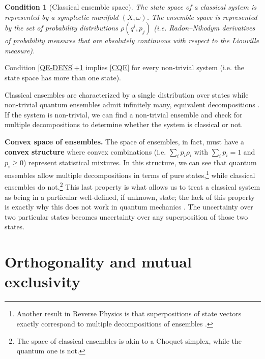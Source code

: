 \documentclass[entropy,article,submit,moreauthors]{Definitions/mdpi}
\newtheorem{condth}{Condition}
\renewcommand*{\thecondth}{\Roman{condth}}
\newenvironment{condition}[2][]{\renewcommand{\thecondth}{#2}\begin{condth}[#1]\label{#2}}{\end{condth}\renewcommand{\thecondth}{\Roman{condth}}}
\begin{document}
\begin{condition}[Classical ensemble space]{CE}
	The state space of a classical system is represented by a symplectic manifold $(X,\omega)$. The ensemble space is represented by the set of probability distributions $\rho(q^i,p_j)$ (i.e. Radon--Nikodym derivatives of probability measures that are absolutely continuous with respect to the Liouville measure).
\end{condition}

\begin{Theorem}
	Condition \ref{QE-DENS}+\ref{CE} implies \ref{CQE} for every non-trivial system (i.e. the state space has more than one state).
\end{Theorem}

Classical ensembles are characterized by a single distribution over states while non-trivial quantum ensembles admit infinitely many, equivalent decompositions \cite{BengtssonZyczkowski2017,Kupsch1998}. If the system is non-trivial, we can find a non-trivial ensemble and check for multiple decompositions to determine whether the system is classical or not.

\textbf{Convex space of ensembles.} The space of ensembles, in fact, must have a \textbf{convex structure} where convex combinations (i.e. $\sum_i p_i \rho_i$ with $\sum_i p_i = 1$ and $p_i\geq 0$) represent statistical mixtures. In this structure, we can see that quantum ensembles allow multiple decompositions in terms of pure states,\footnote{Another result in Reverse Physics is that superpositions of state vectors exactly correspond to multiple decompositions of ensembles \cite{CarcassiCalderonAidala2025,Carcassi2026Superpositions}.} while classical ensembles do not.\footnote{The space of classical ensembles is akin to a Choquet simplex, while the quantum one is not.} This last property is what allows us to treat a classical system as being in a particular well-defined, if unknown, state; the lack of this property is exactly why this does not work in quantum mechanics \cite{Kupsch1998}. The uncertainty over two particular states becomes uncertainty over any superposition of those two states.

\section{Orthogonality and mutual exclusivity}
\end{document}
